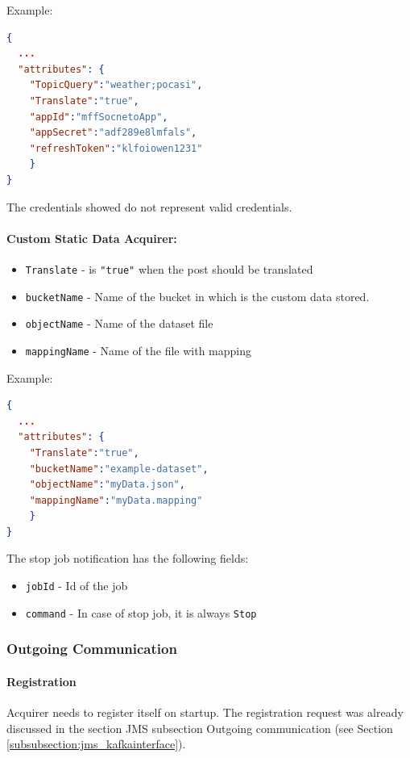 Example: 
\begin{lstlisting}[language=json,firstnumber=1]
{
  ...
  "attributes": {
    "TopicQuery":"weather;pocasi",
    "Translate":"true",
    "appId":"mffSocnetoApp",
    "appSecret":"adf289e8lmfals",
    "refreshToken":"klfoiowen1231"
    }
}
\end{lstlisting}
The credentials showed do not represent valid credentials.

\paragraph{Custom Static Data Acquirer:}
\begin{itemize}
    \item \texttt{Translate} - is \texttt{"true"} when the post should be translated
    \item \texttt{bucketName} - Name of the bucket in which is the custom data stored.
    \item \texttt{objectName} - Name of the dataset file
    \item \texttt{mappingName} - Name of the file with mapping
    
\end{itemize}{}

Example: 
\begin{lstlisting}[language=json,firstnumber=1]
{
  ...
  "attributes": {
    "Translate":"true",
    "bucketName":"example-dataset",
    "objectName":"myData.json",
    "mappingName":"myData.mapping"
    }
}
\end{lstlisting}

The stop job notification has the following fields:

\begin{itemize}
    \item \texttt{jobId} - Id of the job
    \item \texttt{command} - In case of stop job, it is always \texttt{Stop}
\end{itemize}

\subsubsection{Outgoing Communication}\label{section:da_outgoing}

\paragraph{Registration}
Acquirer needs to register itself on startup. The registration request was already discussed in the section JMS subsection Outgoing communication (see Section  \ref{subsubsection:jms_kafkainterface}).

